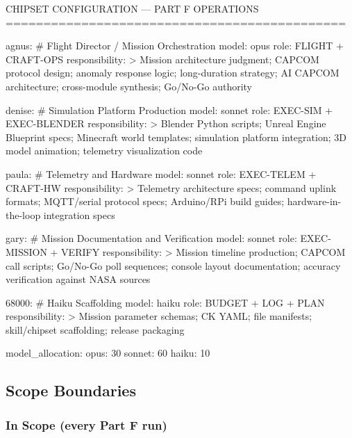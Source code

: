 \documentclass[11pt,letterpaper]{article}
\begin{document}
\begin{asciibox}
CHIPSET CONFIGURATION --- PART F OPERATIONS
=============================================

agnus:                    \# Flight Director / Mission Orchestration
  model: opus
  role: FLIGHT + CRAFT-OPS
  responsibility: >
    Mission architecture judgment; CAPCOM protocol design;
    anomaly response logic; long-duration strategy; AI CAPCOM
    architecture; cross-module synthesis; Go/No-Go authority

denise:                   \# Simulation Platform Production
  model: sonnet
  role: EXEC-SIM + EXEC-BLENDER
  responsibility: >
    Blender Python scripts; Unreal Engine Blueprint specs;
    Minecraft world templates; simulation platform integration;
    3D model animation; telemetry visualization code

paula:                    \# Telemetry and Hardware
  model: sonnet
  role: EXEC-TELEM + CRAFT-HW
  responsibility: >
    Telemetry architecture specs; command uplink formats;
    MQTT/serial protocol specs; Arduino/RPi build guides;
    hardware-in-the-loop integration specs

gary:                     \# Mission Documentation and Verification
  model: sonnet
  role: EXEC-MISSION + VERIFY
  responsibility: >
    Mission timeline production; CAPCOM call scripts;
    Go/No-Go poll sequences; console layout documentation;
    accuracy verification against NASA sources

68000:                    \# Haiku Scaffolding
  model: haiku
  role: BUDGET + LOG + PLAN
  responsibility: >
    Mission parameter schemas; CK YAML; file manifests;
    skill/chipset scaffolding; release packaging

model\_allocation:
  opus: 30%
  sonnet: 60%
  haiku: 10%
\end{asciibox}

\subsection{Scope Boundaries}

\subsubsection{In Scope (every Part F run)}
\end{document}
